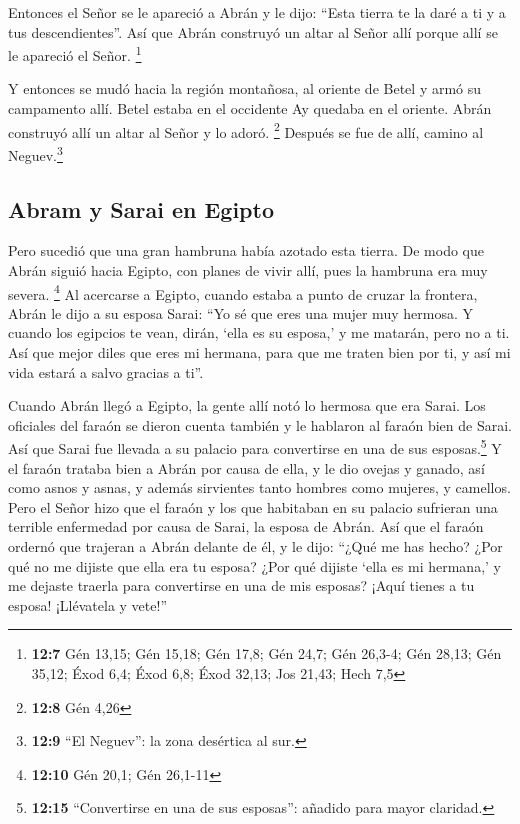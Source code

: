  Entonces el Señor se le apareció a Abrán y le dijo:
``Esta tierra te la daré a ti y a tus descendientes''. Así que Abrán
construyó un altar al Señor allí porque allí se le apareció el Señor.
\footnote{\textbf{12:7} Gén 13,15; Gén 15,18; Gén 17,8; Gén 24,7; Gén
  26,3-4; Gén 28,13; Gén 35,12; Éxod 6,4; Éxod 6,8; Éxod 32,13; Jos
  21,43; Hech 7,5}

 Y entonces se mudó hacia la región montañosa, al oriente
de Betel y armó su campamento allí. Betel estaba en el occidente Ay
quedaba en el oriente. Abrán construyó allí un altar al Señor y lo
adoró. \footnote{\textbf{12:8} Gén 4,26}  Después se fue
de allí, camino al Neguev.\footnote{\textbf{12:9} ``El Neguev'': la zona
  desértica al sur.}

\hypertarget{abram-y-sarai-en-egipto}{%
\subsection{Abram y Sarai en Egipto}\label{abram-y-sarai-en-egipto}}

 Pero sucedió que una gran hambruna había azotado esta
tierra. De modo que Abrán siguió hacia Egipto, con planes de vivir allí,
pues la hambruna era muy severa. \footnote{\textbf{12:10} Gén 20,1; Gén
  26,1-11}  Al acercarse a Egipto, cuando estaba a punto
de cruzar la frontera, Abrán le dijo a su esposa Sarai: ``Yo sé que eres
una mujer muy hermosa.  Y cuando los egipcios te vean,
dirán, `ella es su esposa,' y me matarán, pero no a ti. 
Así que mejor diles que eres mi hermana, para que me traten bien por ti,
y así mi vida estará a salvo gracias a ti''.

 Cuando Abrán llegó a Egipto, la gente allí notó lo
hermosa que era Sarai.  Los oficiales del faraón se
dieron cuenta también y le hablaron al faraón bien de Sarai. Así que
Sarai fue llevada a su palacio para convertirse en una de sus
esposas.\footnote{\textbf{12:15} ``Convertirse en una de sus esposas'':
  añadido para mayor claridad.}  Y el faraón trataba bien
a Abrán por causa de ella, y le dio ovejas y ganado, así como asnos y
asnas, y además sirvientes tanto hombres como mujeres, y camellos.
 Pero el Señor hizo que el faraón y los que habitaban en
su palacio sufrieran una terrible enfermedad por causa de Sarai, la
esposa de Abrán.  Así que el faraón ordernó que trajeran
a Abrán delante de él, y le dijo: ``¿Qué me has hecho? ¿Por qué no me
dijiste que ella era tu esposa?  ¿Por qué dijiste `ella
es mi hermana,' y me dejaste traerla para convertirse en una de mis
esposas? ¡Aquí tienes a tu esposa! ¡Llévatela y vete!''

